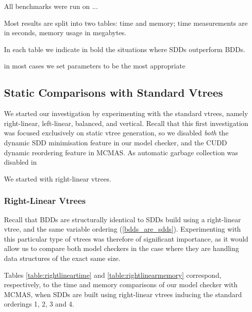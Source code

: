 \documentclass[11pt]{article}
\begin{document}
All benchmarks were run on ...

Most results are split into two tables: time and memory; time measurements are in seconds, memory usage in megabytes.

In each table we indicate in bold the situations where SDDs outperform BDDs.

in most cases we set parameters to be the most appropriate

\subsection{Static Comparisons with Standard Vtrees}

We started our investigation by experimenting with the standard vtrees, namely right-linear, left-linear, balanced, and vertical. Recall that this first investigation was focused exclusively on static vtree generation, so we disabled \textit{both }the dynamic SDD minimisation feature in our model checker, and the CUDD dynamic reordering feature in MCMAS. As automatic garbage collection was disabled in 

We started with right-linear vtrees. 

\subsubsection{Right-Linear Vtrees} 

Recall that BDDs are structurally identical to SDDs build using a right-linear vtree, and the same variable ordering (\ref{bdds_are_sdds}). Experimenting with this particular type of vtrees was therefore of significant importance, as it would allow us to compare both model checkers in the case where they are handling data structures of the exact same size.

Tables \ref{table:rightlineartime} and \ref{table:rightlinearmemory} correspond, respectively, to the time and memory comparisons of our model checker with MCMAS, when SDDs are built using right-linear vtrees inducing the standard orderings 1, 2, 3 and 4. 
\end{document}
